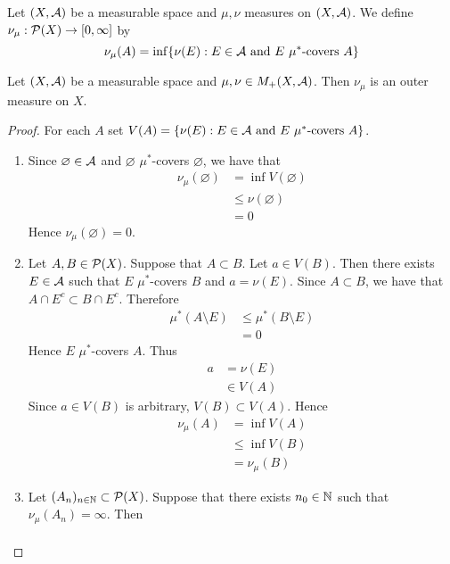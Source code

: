 \documentclass{book}
\begin{document}
	
	\begin{defn}  
		Let $(X, \mathcal{A})$ be a measurable space and $\mu,\nu$ measures on $(X, \mathcal{A})$. We define $\nu_{\mu}: \mathcal{P}(X) \rightarrow [0,\infty]$ by 
		$$\nu_{\mu}(A) = \inf \{\nu(E): E \in \mathcal{A} \text{ and $E$ $\mu^*$-covers $A$} \}$$
	\end{defn}
	
	\begin{ex}   
		Let $(X, \mathcal{A})$ be a measurable space and $\mu,\nu \in M_+(X, \mathcal{A})$. Then $\nu_{\mu}$ is an outer measure on $X$.
	\end{ex}
	
	\begin{proof} For each $A$ set $V(A) = \{\nu(E): E \in \mathcal{A} \text{ and $E$ $\mu^*$-covers $A$} \}$.
		\begin{enumerate}
			\item Since $\varnothing \in \mathcal{A}$ and $\varnothing$ $\mu^*$-covers $\varnothing$, we have that
			\begin{align*}
				\nu_{\mu}(\varnothing) 
				& = \inf V(\varnothing) \\
				& \leq \nu(\varnothing) \\
				& = 0
			\end{align*}
			Hence $\nu_{\mu}(\varnothing) = 0$. 
			\item Let $A, B \in \mathcal{P}(X)$. Suppose that $A \subset B$. Let $a \in V(B)$. Then there exists $E \in \mathcal{A}$ such that $E$ $\mu^*$-covers $B$ and $a = \nu(E)$. Since $A \subset B$, we have that $A \cap E^c \subset B \cap E^c$. Therefore
			\begin{align*}
				\mu^*(A \setminus E)
				& \leq \mu^*(B \setminus E) \\
				& = 0
			\end{align*}
			Hence $E$ $\mu^*$-covers $A$. Thus 
			\begin{align*}
				a
				& = \nu(E) \\
				& \in V(A)
			\end{align*}
			Since $a \in V(B)$ is arbitrary, $V(B) \subset V(A)$. Hence 
			\begin{align*}
				\nu_{\mu}(A)
				& = \inf V(A) \\
				& \leq \inf V(B) \\
				& = \nu_{\mu}(B)
			\end{align*}
			\item Let $(A_n)_{n \in \mathbb{N}} \subset \mathcal{P}(X)$.  Suppose that there exists $n_0 \in \mathbb{N}$ such that $\nu_{\mu}(A_n) = \infty$. Then 
			\begin{align*}

\end{align*}
\end{enumerate}
\end{proof}
\end{document}
